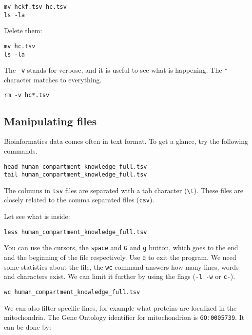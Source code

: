 \documentclass{article}\usepackage[]{graphicx}\usepackage[usenames,dvipsnames]{color}
\begin{document}
\begin{verbatim}
mv hckf.tsv hc.tsv
ls -la
\end{verbatim}

Delete them:

\begin{verbatim}
mv hc.tsv
ls -la
\end{verbatim}

The \verb+-v+ stands for verbose, and it is useful to see what is happening. The \verb+*+ character matches to everything.

\begin{verbatim}
rm -v hc*.tsv
\end{verbatim}

\subsection{Manipulating files}

Bioinformatics data comes often in text format. To get a glance, try the following commands.

\begin{verbatim}
head human_compartment_knowledge_full.tsv
tail human_compartment_knowledge_full.tsv
\end{verbatim}

The columns in \verb+tsv+ files are separated with a tab character (\verb+\t+). These files are closely related to the comma separated files (\verb+csv+).

Let see what is inside:

\begin{verbatim}
less human_compartment_knowledge_full.tsv
\end{verbatim}

You can use the cursors, the \verb+space+ and \verb+G+ and \verb+g+ button, which goes to the end and the beginning of the file respectively. Use \verb+q+ to exit the program. We need some statistics about the file, the \verb+wc+ command answers how many lines, words and characters exist. We can limit it further by using the flags (\verb+-l -w+ or \verb+c-+).

\begin{verbatim}
wc human_compartment_knowledge_full.tsv
\end{verbatim}

We can also filter specific lines, for example what proteins are localized in the mitochondria. The Gene Ontology identifier for mitochondrion is \verb+GO:0005739+. It can be done by:
\end{document}
